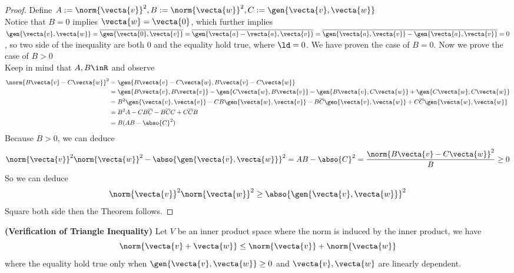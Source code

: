 \documentclass{report}
\begin{document}
\begin{proof}
Define $A:=\norm{\vecta{v}}^2,B:=\norm{\vecta{w}}^2,C:=\gen{\vecta{v},\vecta{w}}$\\

Notice that $B=0$ implies $\vecta{w}=\vecta{0}$, which further implies $\gen{\vecta{v},\vecta{w}}=\overline{\gen{\vecta{0},\vecta{v}}}=\overline{\gen{\vecta{a}-\vecta{a},\vecta{v}}}=\overline{\gen{\vecta{a},\vecta{v}}-\gen{\vecta{a},\vecta{v}}}=0$, so two side of the inequality are both  $0$ and the equality hold true, where $\ld =0$. We have proven the case of $B=0$. Now we prove the case of $B>0$\\

Keep in mind that $A,B\inR$ and observe
\begin{align}
\norm{B\vecta{v}-C\vecta{w}}^2&=\gen{B\vecta{v}-C\vecta{w},B\vecta{v}-C\vecta{w}}\\
&=\gen{B\vecta{v},B\vecta{v}}-\gen{C\vecta{w},B\vecta{v}}-\gen{B\vecta{v},C\vecta{w}}+\gen{C\vecta{w},C\vecta{w}}\\
&=B^2\gen{\vecta{v},\vecta{v}}-CB\gen{\vecta{w},\vecta{v}}-B\overline{C}\gen{\vecta{v},\vecta{w}}+C\overline{C}\gen{\vecta{w},\vecta{w}}\\
&=B^2A-CB\overline{C}-B\overline{C}C+C\overline{C}B\\
&=B(AB-\abso{C}^2)
\end{align}
Because $B>0$, we can deduce 
 \begin{equation}
\norm{\vecta{v}}^2\norm{\vecta{w}}^2-\abso{\gen{\vecta{v},\vecta{w}}}^2=AB-\abso{C}^2=\frac{\norm{B\vecta{v}-C\vecta{w}}^2}{B}\geq 0
\end{equation}
So we can deduce
\begin{equation}
\norm{\vecta{v}}^2\norm{\vecta{w}}^2\geq \abso{\gen{\vecta{v},\vecta{w}}}^2
\end{equation}
Square both side then the Theorem follows. 
\end{proof}
\begin{corollary}
\label{1.6.13}
\textbf{(Verification of Triangle Inequality)} Let $V$ be an inner product space where the norm is induced by the inner product, we have 
 \begin{equation}
   \norm{\vecta{v}+\vecta{w}}\leq\norm{\vecta{v}}+\norm{\vecta{w}}
\end{equation}
where the equality hold true only when $\gen{\vecta{v},\vecta{w}}\geq 0$ and $\vecta{v},\vecta{w}$ are linearly dependent.
\end{corollary}
\end{document}
